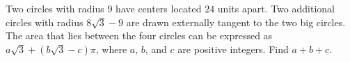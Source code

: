Two circles with radius $9$ have centers located $24$ units apart. Two additional circles with radius $8\sqrt3-9$ are drawn externally tangent to the two big circles. The area that lies between the four circles can be expressed as $a\sqrt3 + (b\sqrt3 - c)\pi$, where $a$, $b$, and $c$ are positive integers. Find $a + b + c$.
